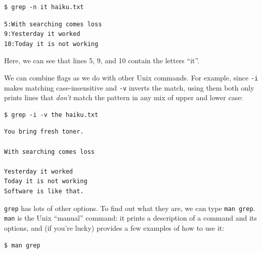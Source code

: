 \documentclass{book}
\begin{document}
\begin{verbatim}
$ grep -n it haiku.txt
\end{verbatim}

\begin{verbatim}
5:With searching comes loss
9:Yesterday it worked
10:Today it is not working
\end{verbatim}

Here, we can see that lines 5, 9, and 10 contain the letters ``it''.

We can combine flags as we do with other Unix commands. For example,
since \texttt{-i} makes matching case-insensitive and \texttt{-v}
inverts the match, using them both only prints lines that \emph{don't}
match the pattern in any mix of upper and lower case:

\begin{verbatim}
$ grep -i -v the haiku.txt
\end{verbatim}

\begin{verbatim}
You bring fresh toner.

With searching comes loss

Yesterday it worked
Today it is not working
Software is like that.
\end{verbatim}

\texttt{grep} has lots of other options. To find out what they are, we
can type \texttt{man grep}. \texttt{man} is the Unix ``manual'' command:
it prints a description of a command and its options, and (if you're
lucky) provides a few examples of how to use it:

\begin{verbatim}
$ man grep
\end{verbatim}
\end{document}
